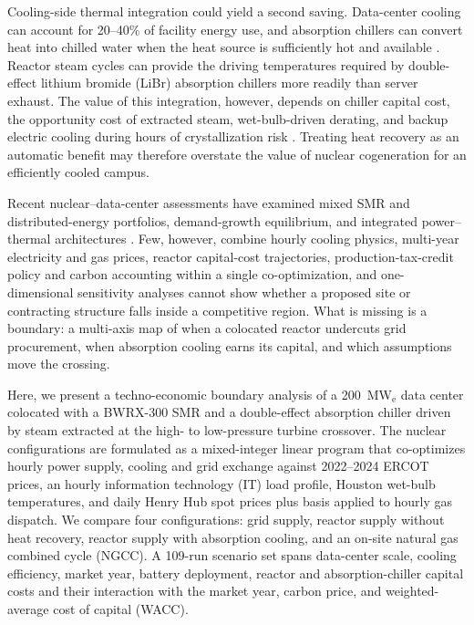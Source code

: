\documentclass[a4paper,fleqn]{cas-sc}
\begin{document}
Cooling-side thermal integration could yield a second saving. Data-center cooling can account for 20--40\% of facility energy use, and absorption chillers can convert heat into chilled water when the heat source is sufficiently hot and available \citep{ebrahimi2014review,yuan2023wasteHeatReview,amiri2021}. Reactor steam cycles can provide the driving temperatures required by double-effect lithium bromide (LiBr) absorption chillers more readily than server exhaust. The value of this integration, however, depends on chiller capital cost, the opportunity cost of extracted steam, wet-bulb-driven derating, and backup electric cooling during hours of crystallization risk \citep{srikhirin2001absorption,herold2016absorption,cui2025switchable}. Treating heat recovery as an automatic benefit may therefore overstate the value of nuclear cogeneration for an efficiently cooled campus.

Recent nuclear--data-center assessments have examined mixed SMR and distributed-energy portfolios, demand-growth equilibrium, and integrated power--thermal architectures \citep{debnath2025smrDER,you2025dynamicEquilibrium,bhowmik2026nuclearDC,zhang2026nuclearDC}. Few, however, combine hourly cooling physics, multi-year electricity and gas prices, reactor capital-cost trajectories, production-tax-credit policy and carbon accounting within a single co-optimization, and one-dimensional sensitivity analyses cannot show whether a proposed site or contracting structure falls inside a competitive region. What is missing is a boundary: a multi-axis map of when a colocated reactor undercuts grid procurement, when absorption cooling earns its capital, and which assumptions move the crossing.

Here, we present a techno-economic boundary analysis of a 200~MW$_\mathrm{e}$ data center colocated with a BWRX-300 SMR and a double-effect absorption chiller driven by steam extracted at the high- to low-pressure turbine crossover. The nuclear configurations are formulated as a mixed-integer linear program that co-optimizes hourly power supply, cooling and grid exchange against 2022--2024 ERCOT prices, an hourly information technology (IT) load profile, Houston wet-bulb temperatures, and daily Henry Hub spot prices plus basis applied to hourly gas dispatch. We compare four configurations: grid supply, reactor supply without heat recovery, reactor supply with absorption cooling, and an on-site natural gas combined cycle (NGCC). A 109-run scenario set spans data-center scale, cooling efficiency, market year, battery deployment, reactor and absorption-chiller capital costs and their interaction with the market year, carbon price, and weighted-average cost of capital (WACC).
\end{document}
